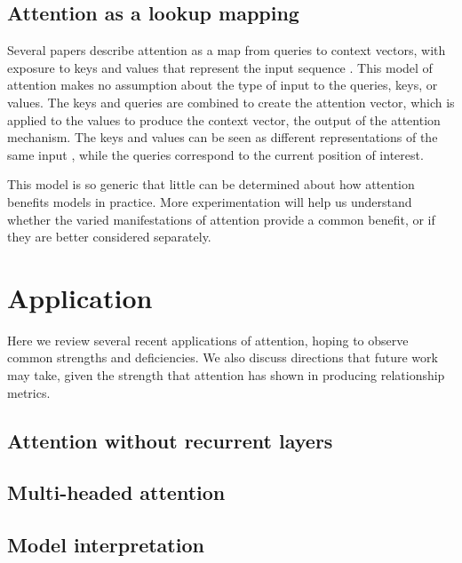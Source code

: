 \documentclass{article}
\begin{document}
\subsection{Attention as a lookup mapping}

Several papers describe attention as a map from queries to context vectors, with exposure to keys and values that represent the input sequence \cite{attn_all_you_need,attention_please}. This model of attention makes no assumption about the type of input to the queries, keys, or values. The keys and queries are combined to create the attention vector, which is applied to the values to produce the context vector, the output of the attention mechanism. The keys and values can be seen as different representations of the same input \cite{attention_please}, while the queries correspond to the current position of interest.

This model is so generic that little can be determined about how attention benefits models in practice. More experimentation will help us understand whether the varied manifestations of attention provide a common benefit, or if they are better considered separately.

\section{Application}

Here we review several recent applications of attention, hoping to observe common strengths and deficiencies. We also discuss directions that future work may take, given the strength that attention has shown in producing relationship metrics.

\subsection{Attention without recurrent layers}

\cite{attn_all_you_need}

\subsection{Multi-headed attention}\label{section:multi_headed}

\cite{attn_all_you_need}

\subsection{Model interpretation}
\end{document}
